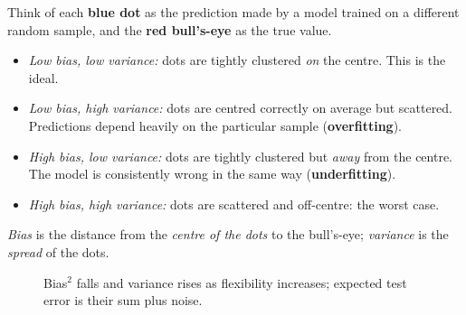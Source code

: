 \begin{explain}
Think of each \textbf{blue dot} as the prediction made by a model trained on a different random sample, and the \textbf{red bull's-eye} as the true value.
\begin{itemize}
  \item \emph{Low bias, low variance:} dots are tightly clustered \emph{on} the centre. This is the ideal.
  \item \emph{Low bias, high variance:} dots are centred correctly on average but scattered. Predictions depend heavily on the particular sample (\textbf{overfitting}).
  \item \emph{High bias, low variance:} dots are tightly clustered but \emph{away} from the centre. The model is consistently wrong in the same way (\textbf{underfitting}).
  \item \emph{High bias, high variance:} dots are scattered and off-centre: the worst case.
\end{itemize}
\emph{Bias} is the distance from the \emph{centre of the dots} to the bull's-eye; \emph{variance} is the \emph{spread} of the dots.
\end{explain}

\begin{figure}[!htbp]
\centering
{}
\caption{Bias$^2$ falls and variance rises as flexibility increases; expected test error is their sum plus noise.}\label{fig:bvcurve}
\end{figure}


